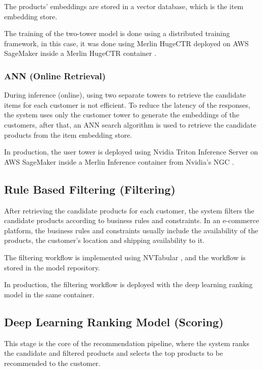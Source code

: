 The products' embeddings are stored in a vector database, which is the item embedding store.

The training of the two-tower model is done using a distributed training framework, in this case,
 it was done using Merlin HugeCTR \cite{NvidiaHugeCTR} deployed on AWS SageMaker \cite{AwsSageMaker} inside a Merlin HugeCTR container \cite{HugeCTRContainer}.

\subsubsection{ANN (Online Retrieval)}

During inference (online), using two separate towers to retrieve the candidate items for each customer is not efficient. \cite{NvidiaFeatureStores}
To reduce the latency of the responses, the system uses only the customer tower to generate the embeddings of the customers,
after that, an ANN search algorithm is used to retrieve the candidate products from the item embedding store.

In production, the user tower is deployed using Nvidia Triton Inference Server \cite{Triton} on 
AWS SageMaker \cite{AwsSageMaker} inside a Merlin Inference container \cite{NvidiaMerlinInference} from Nvidia's NGC \cite{NvidiaNGC}.

\subsection{Rule Based Filtering (Filtering)}

After retrieving the candidate products for each customer, the system filters the candidate products according to business rules and constraints.
In an e-commerce platform, the business rules and constraints usually include the availability of the products, the customer's location and shipping availability to it.


The filtering workflow is implemented using NVTabular \cite{MerlinNVTabular}, and the workflow is stored in the model repository.

In production, the filtering workflow is deployed with the deep learning ranking model in the same container.

\subsection{Deep Learning Ranking Model (Scoring)}

This stage is the core of the recommendation pipeline, where the system ranks the candidate and filtered products and selects the top products to be recommended to the customer.

